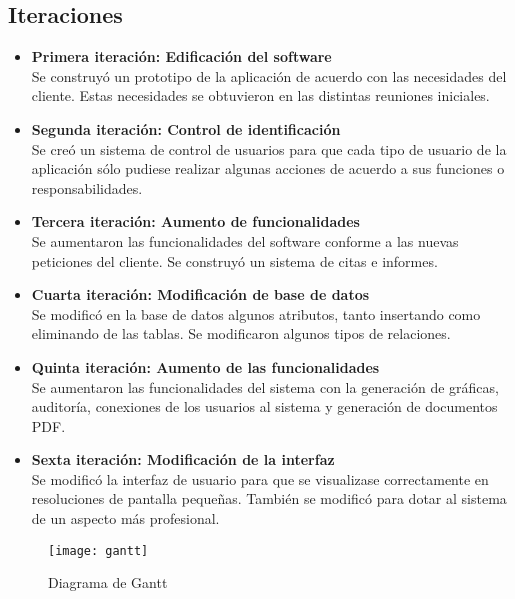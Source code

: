 \begin{itemize}
\subsection{Iteraciones}
\begin{itemize}
\item \textbf{Primera iteración: Edificación del software}\\
Se construyó un prototipo de la aplicación de acuerdo con las necesidades del cliente. Estas necesidades se obtuvieron en las distintas reuniones iniciales.\\
\item \textbf{Segunda iteración: Control de identificación}\\
Se creó un sistema de control de usuarios para que cada tipo de usuario de la aplicación sólo pudiese realizar algunas acciones de acuerdo a sus funciones o responsabilidades.\\
\item \textbf{Tercera iteración: Aumento de funcionalidades}\\
Se aumentaron las funcionalidades del software conforme a las nuevas peticiones del cliente. Se construyó un sistema de citas e informes.\\
\item \textbf{Cuarta iteración: Modificación de base de datos}\\
Se modificó en la base de datos algunos atributos, tanto insertando como eliminando de las tablas. Se modificaron algunos tipos de relaciones.\\
\item \textbf{Quinta iteración: Aumento de las funcionalidades}\\
Se aumentaron las funcionalidades del sistema con la generación de gráficas, auditoría, conexiones de los usuarios al sistema y generación de documentos PDF.\\
\item \textbf{Sexta iteración: Modificación de la interfaz}\\
Se modificó la interfaz de usuario para que se visualizase correctamente en resoluciones de pantalla pequeñas. También se modificó para dotar al sistema de un aspecto más profesional.

\end{itemize}
 
\end{itemize}
\newpage
\begin{figure}[H]
  \centering
    \texttt{[image: gantt]}
  \caption{Diagrama de Gantt}
  \label{Figura}
\end{figure}


